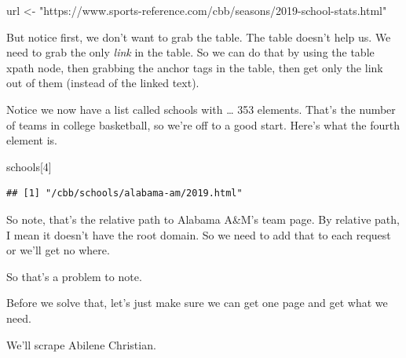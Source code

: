 \documentclass[]{book}
\newenvironment{Shaded}{\begin{snugshade}}{\end{snugshade}}
\newcommand{\DataTypeTok}[1]{\textcolor[rgb]{0.13,0.29,0.53}{#1}}
\newcommand{\DecValTok}[1]{\textcolor[rgb]{0.00,0.00,0.81}{#1}}
\newcommand{\KeywordTok}[1]{\textcolor[rgb]{0.13,0.29,0.53}{\textbf{#1}}}
\newcommand{\NormalTok}[1]{#1}
\newcommand{\OperatorTok}[1]{\textcolor[rgb]{0.81,0.36,0.00}{\textbf{#1}}}
\newcommand{\StringTok}[1]{\textcolor[rgb]{0.31,0.60,0.02}{#1}}
\begin{document}
\begin{Shaded}
\begin{Highlighting}[]
\NormalTok{url <-}\StringTok{ "https://www.sports-reference.com/cbb/seasons/2019-school-stats.html"}
\end{Highlighting}
\end{Shaded}

But notice first, we don't want to grab the table. The table doesn't help us. We need to grab the only \emph{link} in the table. So we can do that by using the table xpath node, then grabbing the anchor tags in the table, then get only the link out of them (instead of the linked text).

\begin{Shaded}
\end{Shaded}

Notice we now have a list called schools with \ldots{} 353 elements. That's the number of teams in college basketball, so we're off to a good start. Here's what the fourth element is.

\begin{Shaded}
\begin{Highlighting}[]
\NormalTok{schools[}\DecValTok{4}\NormalTok{]}
\end{Highlighting}
\end{Shaded}

\begin{verbatim}
## [1] "/cbb/schools/alabama-am/2019.html"
\end{verbatim}

So note, that's the relative path to Alabama A\&M's team page. By relative path, I mean it doesn't have the root domain. So we need to add that to each request or we'll get no where.

So that's a problem to note.

Before we solve that, let's just make sure we can get one page and get what we need.

We'll scrape Abilene Christian.
\end{document}

